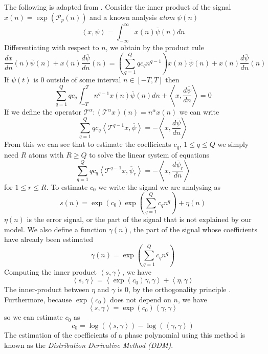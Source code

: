 The following is adapted from \cite{betser2009sinusoidal}. Consider the inner
product of the signal $x(n) = \exp(\mathcal{P}_p(n)) $ and a
known analysis \textit{atom} $\psi(n)$
\[
    \left\langle x,\psi \right\rangle =
    \int_{-\infty}^{\infty}x(n)\overline{\psi}(n)dn
\]
Differentiating with respect to $n$, we obtain by the product rule
\[
    \frac{dx}{dn}(n)\overline{\psi}(n)
    + x(n)\frac{d\overline{\psi}}{dn}(n)
    = \left( \sum_{q=1}^{Q} q c_q n^{q-1} \right) x(n)\overline{\psi}(n)
    + x(n)\frac{d\overline{\psi}}{dn}(n)
\]
If $\psi(t)$ is 0 outside of some interval $n \in [-T,T]$ then
\[
    \sum_{q=1}^{Q} q c_q \int_{-T}^{T} n^{q-1} x(n) \overline{\psi}(n) dn
    + \left\langle x, \frac{d\overline{\psi}}{dn} \right\rangle = 0
\]
If we define the operator $\mathcal{T}^{\alpha} : (\mathcal{T}^{\alpha}x)(n) =
n^{\alpha}x(n)$ we can write
\[ 
    \sum_{q=1}^{Q} q c_q 
    \left\langle \mathcal{T}^{q-1} x , \overline{\psi} \right\rangle
    = -\left\langle x, \frac{d\overline{\psi}}{dn} \right\rangle
\]
From this we can see that to estimate the coefficients $c_q$, $ 1 \leq q \leq Q
$ we simply need $R$ atoms with $R \geq Q$ to solve the linear system of
equations
\begin{equation}
    \label{eq:ddmsyseq}
    \sum_{q=1}^{Q} q c_q 
    \left\langle \mathcal{T}^{q-1} x , \overline{\psi}_{r} \right\rangle
    = -\left\langle x, \frac{d\overline{\psi}_{r}}{dn} \right\rangle
\end{equation}
for $1 \leq r \leq R$. To estimate $c_0$ we write the signal we are analysing as
\[
    s(n) = \exp(c_0) \exp \left( \sum_{q=1}^{Q} c_q n^{q} \right) + \eta (n)
\]
$\eta (n)$ is the error signal, or the part of the signal that is not explained
by our model. We also define a function $\gamma (n)$, the part of the signal
whose coefficients have already been estimated
\[
    \gamma(n) = \exp \left( \sum_{q=1}^{Q} c_q n^{q} \right)
\]
Computing the inner product $\left\langle s , \gamma \right\rangle$, we have
\[
    \left\langle s , \gamma \right\rangle
    =
    \left\langle \exp(c_0) \gamma , \gamma \right\rangle + 
        \left\langle \eta , \gamma \right\rangle
\]
The inner-product between $\eta$ and $\gamma$ is $0$, by the orthogonality
principle \cite[ch.~12]{kay1993fundamentals}. Furthermore, because $\exp(c_0)$ does not
depend on $n$, we have
\[
    \left\langle s , \gamma \right\rangle
    =
    \exp(c_0) \left\langle \gamma , \gamma \right\rangle
\]
so we can estimate $c_0$ as
\begin{equation}
    \label{eq:ddmestc0}
    c_0 = \log \left( \left\langle s , \gamma \right\rangle \right)
        - \log \left( \left\langle \gamma , \gamma \right\rangle \right)
\end{equation}
The estimation of the coefficients of a phase polynomial
using this method is known as the \textit{Distribution Derivative Method (DDM)}.


